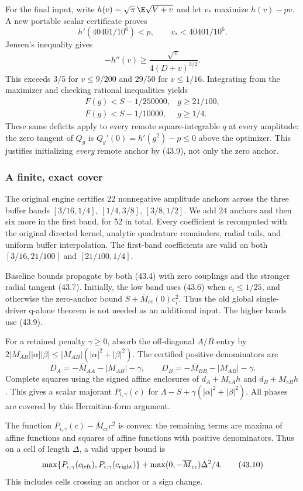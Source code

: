 For the final input, write
$h(v)=\sqrt\pi\,\E\sqrt{V+v}$ and let $v_*$ maximize $h(v)-pv$.
A new portable scalar certificate proves
\[
 h'(40401/10^6)<p,\qquad v_*<40401/10^6.
 \tag{43.8}
\]
Jensen's inequality gives
\[
 -h''(v)\ge\frac{\sqrt\pi}{4(D+v)^{3/2}}.
\]
This exceeds $3/5$ for $v\le9/200$ and $29/50$ for $v\le1/16$.
Integrating from the maximizer and checking rational inequalities yields
\[
 \begin{array}{ll}
 F(g)<S-1/250000,&g\ge21/100,\\
 F(g)<S-1/10000,&g\ge1/4 .
 \end{array}                                         \tag{43.9}
\]
These same deficits apply to every remote square-integrable $q$ at
every amplitude: the zero tangent of $Q_g$ is
$Q_g'(0)=h'(g^2)-p\le0$ above the optimizer. This
justifies initializing \emph{every} remote anchor by (43.9), not only
the zero anchor.

\subsubsection{A finite, exact cover}
The original engine certifies 22 nonnegative amplitude anchors across
the three buffer bands $[3/16,1/4]$, $[1/4,3/8]$, $[3/8,1/2]$.
We add 24 anchors and then six more in the first band, for 52 in total.
Every coefficient is recomputed with the original directed kernel,
analytic quadrature remainders, radial tails, and uniform buffer
interpolation. The first-band coefficients are valid on both
$[3/16,21/100]$ and $[21/100,1/4]$.

Baseline bounds propagate by both (43.4) with zero couplings and the
stronger radial tangent (43.7). Initially, the low band uses (43.6)
when $c_i\le1/25$, and otherwise the zero-anchor bound
$S+\overline M_{cc}(0)c_i^2$. Thus the old global single-driver
q-alone theorem is not needed as an additional input.
The higher bands use (43.9).

For a retained penalty $\gamma\ge0$, absorb the off-diagonal
$A/B$ entry by
$2|M_{AB}||\alpha||\beta|
\le |M_{AB}|(|\alpha|^2+|\beta|^2)$.
The certified positive denominators are
\[
 D_A=-\overline M_{AA}-|M_{AB}|-\gamma,\qquad
 D_B=-\overline M_{BB}-|M_{AB}|-\gamma .
 \]
Complete squares using the signed affine enclosures of
$d_A+M_{cA}h$ and $d_B+M_{cB}h$.
This gives a scalar majorant $P_{i,\gamma}(c)$ for
$\Lambda-S+\gamma(|\alpha|^2+|\beta|^2)$.
All phases are covered by this Hermitian-form argument.

The function $P_{i,\gamma}(c)-\overline M_{cc}c^2$ is convex:
the remaining terms are maxima of affine functions and squares of
affine functions with positive denominators. Thus on a cell of
length $\Delta$, a valid upper bound is
\[
 \max\{P_{i,\gamma}(c_{\rm left}),
       P_{i,\gamma}(c_{\rm right})\}
 +\max(0,-\overline M_{cc})\Delta^2/4.                \tag{43.10}
\]
This includes cells crossing an anchor or a sign change.

